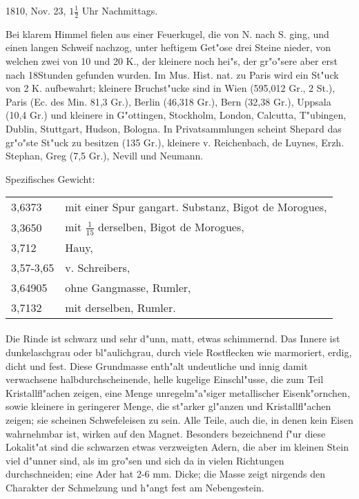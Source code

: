\documentclass[a4paper, 11pt, oneside]{article}
\begin{document}
1810, Nov. 23, $1\frac{1}{2}$ Uhr Nachmittags.

Bei klarem Himmel fielen aus einer Feuerkugel, die von N. nach S. ging, und einen langen Schweif nachzog, unter heftigem Get"ose drei Steine nieder, von welchen zwei von 10 und 20 K., der kleinere noch hei"s, der gr"o"sere aber erst nach 18Stunden gefunden wurden. Im Mus. Hist. nat. zu Paris wird ein St"uck von 2 K. aufbewahrt; kleinere Bruchst"ucke sind in Wien (595,012 Gr., 2 St.), Paris (Ec. des Min. 81,3 Gr.), Berlin (46,318 Gr.), Bern (32,38 Gr.), Uppsala (10,4 Gr.) und kleinere in G"ottingen, Stockholm, London, Calcutta, T"ubingen, Dublin, Stuttgart, Hudson, Bologna. In Privatsammlungen scheint Shepard das gr"o"ste St"uck zu besitzen (135 Gr.), kleinere v. Reichenbach, de Luynes, Erzh. Stephan, Greg (7,5 Gr.), Nevill und Neumann.

Spezifisches Gewicht:
\begin{table}[!ht]
    \centering
    \begin{tabular}{l l}
        3,6373 & mit einer Spur gangart. Substanz, Bigot de Morogues,\\
        3,3650 & mit $\frac{1}{15}$ derselben, Bigot de Morogues,\\
        3,712 & Hauy,\\
        3,57-3,65 & v. Schreibers,\\
        3,64905 & ohne Gangmasse, Rumler,\\
        3,7132 & mit derselben, Rumler.
    \end{tabular}
\end{table}
\paragraph{}
Die Rinde ist schwarz und sehr d"unn, matt, etwas schimmernd. Das Innere ist dunkelaschgrau oder bl"aulichgrau, durch viele Rostflecken wie marmoriert, erdig, dicht und fest. Diese Grundmasse enth"alt undeutliche und innig damit verwachsene halbdurchscheinende, helle kugelige Einschl"usse, die zum Teil Kristallfl"achen zeigen, eine Menge unregelm"a"siger metallischer Eisenk"ornchen, sowie kleinere in geringerer Menge, die st"arker gl"anzen und Kristallfl"achen zeigen; sie scheinen Schwefeleisen zu sein. Alle Teile, auch die, in denen kein Eisen wahrnehmbar ist, wirken auf den Magnet. Besonders bezeichnend f"ur diese Lokalit"at sind die schwarzen etwas verzweigten Adern, die aber im kleinen Stein viel d"unner sind, als im gro"sen und sich da in vielen Richtungen durchschneiden; eine Ader hat 2-6 mm. Dicke; die Masse zeigt nirgends den Charakter der Schmelzung und h"angt fest am Nebengestein.
\end{document}

